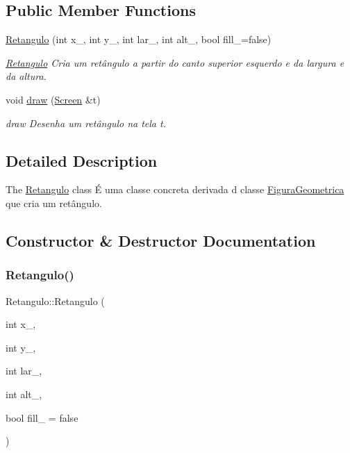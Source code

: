\subsection*{Public Member Functions}
\begin{DoxyCompactItemize}
\item 
\hyperlink{class_retangulo_a3ab444178608ed5efab9889fb5780158}{Retangulo} (int x\+\_\+, int y\+\_\+, int lar\+\_\+, int alt\+\_\+, bool fill\+\_\+=false)
\begin{DoxyCompactList}\small\item\em \hyperlink{class_retangulo}{Retangulo} Cria um retângulo a partir do canto superior esquerdo e da largura e da altura. \end{DoxyCompactList}\item 
void \hyperlink{class_retangulo_ac088dd6d3f4f3d3f80363a868c2e74f1}{draw} (\hyperlink{class_screen}{Screen} \&t)
\begin{DoxyCompactList}\small\item\em draw Desenha um retângulo na tela t. \end{DoxyCompactList}\end{DoxyCompactItemize}


\subsection{Detailed Description}
The \hyperlink{class_retangulo}{Retangulo} class É uma classe concreta derivada d classe \hyperlink{class_figura_geometrica}{Figura\+Geometrica} que cria um retângulo. 

\subsection{Constructor \& Destructor Documentation}
\mbox{\label{class_retangulo_a3ab444178608ed5efab9889fb5780158}} 
\subsubsection{\texorpdfstring{Retangulo()}{Retangulo()}}
{\footnotesize\ttfamily Retangulo\+::\+Retangulo (\begin{DoxyParamCaption}\item[{int}]{x\+\_\+,  }\item[{int}]{y\+\_\+,  }\item[{int}]{lar\+\_\+,  }\item[{int}]{alt\+\_\+,  }\item[{bool}]{fill\+\_\+ = {\ttfamily false} }\end{DoxyParamCaption})}



